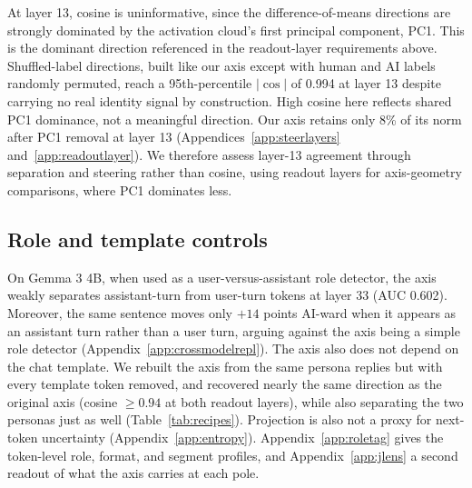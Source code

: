 At layer 13, cosine is uninformative, since the
difference-of-means directions are strongly dominated by the activation
cloud's first principal component, PC1. This is the dominant direction
referenced in the readout-layer requirements above. Shuffled-label directions,
built like our axis except with human and AI labels randomly
permuted, reach a 95th-percentile $|\cos|$ of 0.994 at layer 13 despite carrying no real
identity signal by construction. High cosine here reflects shared
PC1 dominance, not a meaningful direction. Our axis retains
only 8\% of its norm after PC1 removal at layer 13 (Appendices~\ref{app:steerlayers}
and~\ref{app:readoutlayer}). We therefore assess layer-13 agreement through separation
and steering rather than cosine, using readout layers for axis-geometry comparisons,
where PC1 dominates less.

\subsection{Role and template controls}

On Gemma 3 4B, when used as a user-versus-assistant role detector, the axis weakly separates
assistant-turn from user-turn tokens at layer 33 (AUC 0.602). Moreover,
the same sentence moves only $+14$ points AI-ward when it appears as an
assistant turn rather than a user turn, arguing against the axis being a
simple role detector (Appendix~\ref{app:crossmodelrepl}). The axis also does not depend
on the chat template. We rebuilt the axis from the same persona replies
but with every template token removed, and recovered nearly the same
direction as the original axis (cosine $\geq 0.94$ at both readout layers),
while also separating the two personas just as well (Table~\ref{tab:recipes}).
Projection is also not a proxy for next-token uncertainty
(Appendix~\ref{app:entropy}). Appendix~\ref{app:roletag} gives the
token-level role, format, and segment profiles, and Appendix~\ref{app:jlens}
a second readout of what the axis carries at each pole.

\FloatBarrier
